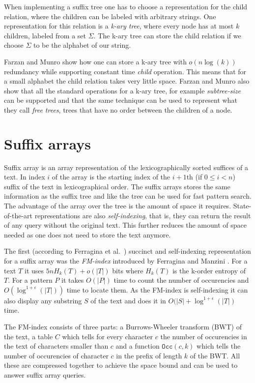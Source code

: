 \documentclass[11pt]{article}
\newcommand{\bigo}{O}
\newcommand{\smallo}{o}
\begin{document}
When implementing a suffix tree one has to choose a representation for
the child relation, where the children can be labeled with arbitrary
strings. One representation for this relation is a \emph{k-ary tree},
where every node has at most $k$ children, labeled from a set
$\Sigma$. The k-ary tree can store the child relation if we choose
$\Sigma$ to be the alphabet of our string.

Farzan and Munro show \cite{farzan08} how one can store a k-ary tree
with $\smallo(n\log(k))$ redundancy while supporting constant time
\textit{child} operation. This means that for a small alphabet the
child relation takes very little space. Farzan and Munro also show
that all the standard operations for a k-ary tree, for example
\textit{subtree-size} can be supported and that the same technique can
be used to represent what they call \emph{free trees}, trees that have
no order between the children of a node.

\section{Suffix arrays}

Suffix array is an array representation of the lexicographically
sorted suffices of a text. In index $i$ of the array is the starting
index of the $i+1$th (if $0 \le i < n$) suffix of the text in
lexicographical order. The suffix arrays stores the same information
as the suffix tree and like the tree can be used for fast pattern
search. The advantage of the array over the tree is the amount of
space it requires. State-of-the-art representations are also
\emph{self-indexing}, that is, they can return the result of any query
without the original text. This further reduces the amount of space
needed as one does not need to store the text anymore.

The first (according to Ferragina et al.\ \cite{ferragina07}) succinct
and self-indexing representation for a suffix array was the
\emph{FM-index} introduced by Ferragina and Manzini
\cite{ferragina05}. For a text $T$ it uses $5nH_k(T) + \smallo(|T|)$
bits where $H_k(T)$ is the k-order entropy of $T$. For a pattern $P$
it takes $\bigo(|P|)$ time to count the number of occurencies and
$\bigo(\log^{1+\epsilon}(|T|))$ time to locate them. As the FM-index
is self-indexing it can also display any substring $S$ of the text and
does it in $\bigo(|S| + \log^{1+\epsilon}(|T|)$ time.

The FM-index consists of three parts: a Burrows-Wheeler transform
\cite{burrows94} (BWT) of the text, a table $C$ which tells for every
character $c$ the number of occurencies in the text of characters
smaller than $c$ and a function $\texttt{Occ}(c,k)$ which tells the
number of occurencies of character $c$ in the prefix of length $k$ of
the BWT. All these are compressed together to achieve the space bound
and can be used to answer suffix array queries.
\end{document}
